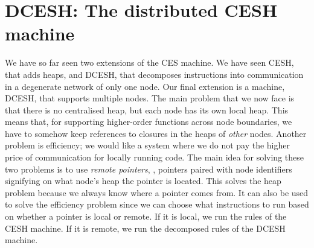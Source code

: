 \documentclass{article}
\theoremstyle{definition}
\newcommand{\DCESHi}{DCESH}
\newcommand{\DCESHn}{DCESH}
\newcommand{\Conid}[1]{\mathit{#1}}
\newcommand{\Varid}[1]{\mathit{#1}}
\def\resethooks{\global\let\SaveRestoreHook\empty
  \global\let\ColumnHook\empty}
\let\hspost\empty
\renewcommand\Varid[1]{\mathord{\textsf{#1}}}
\let\Conid\Varid
\newcommand\Keyword[1]{\textsf{\textbf{#1}}}
\renewcommand\Keyword[1]{\textsf{\underline{#1}}}
\renewcommand\Varid[1]{\textsf{#1}}
\begin{document}
\section{\DCESHn: The distributed CESH machine} \label{section:DCESH}

\begin{comment}
\begin{hscode}\SaveRestoreHook
\column{B}{@{}>{\hspre}l<{\hspost}@{}}\column{E}{@{}>{\hspre}l<{\hspost}@{}}\>[B]{}\Keyword{open}\;\Keyword{import}\;\Conid{GeneralLemmas}\;\Keyword{using}\;(\Conid{Dec};\Varid{\char95 ≡\char95 }){}\<[E]\ColumnHook
\end{hscode}\resethooks
\end{comment}

We have so far seen two extensions of the CES machine. We have seen
CESH, that adds heaps, and \DCESHi{}, that decomposes instructions
into communication in a degenerate network of only one node.
Our final extension is a machine, \DCESHn{}, that supports multiple nodes.
The main problem that we now face is that there is no centralised heap,
but each node has its own local heap. This means that, for
supporting higher-order functions across node boundaries, we have to
somehow keep references to closures in the heaps of \emph{other} nodes.
Another problem is efficiency; we would like a system where we do
not pay the higher price of communication for locally running code.
The main idea for solving these two problems is to use
\emph{remote pointers}, {\textsmaller[.5]{\ensuremath{\Conid{RPtr}\;\mathrel{=}\;\Conid{Ptr}\;\Varid{×}\;\Conid{Node}}}}, pointers paired with node
identifiers signifying on what node's heap the pointer is located.
This solves the heap problem because we always know
where a pointer comes from. It can also be used to solve the
efficiency problem since we can choose what instructions to run based on
whether a pointer is local or remote. If it is local, we run the
rules of the CESH machine. If it is remote, we run the
decomposed rules of the \DCESHi{} machine.
\end{document}
